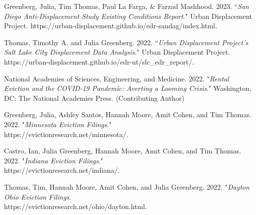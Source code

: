 \begin{cvparagraph}

Greenberg, Julia, Tim Thomas, Paul La Farga, \& Farzad Mashhood. 2023. “\emph{San Diego Anti-Displacement Study Existing Conditions Report}." Urban Displacement Project. https://urban-displacement.github.io/edr-sandag/index.html.
\end{cvparagraph}

\begin{cvparagraph}

Thomas, Timothy A. and Julia Greenberg. 2022. “\emph{Urban Displacement Project’s Salt Lake City Displacement Data Analysis}." Urban Displacement Project. https://urban-displacement.github.io/edr-ut/slc\_edr\_report/.
\end{cvparagraph}

\begin{cvparagraph}

National Academies of Sciences, Engineering, and Medicine. 2022. "\emph{Rental Eviction and the COVID-19 Pandemic: Averting a Looming Crisis}." Washington, DC: The National Academies Press. (Contributing Author)
\end{cvparagraph}

\begin{cvparagraph}

Greenberg, Julia, Ashley Santos, Hannah Moore, Amit Cohen, and Tim Thomas. 2022. "\emph{Minnesota Eviction Filings}."\\ https://evictionresearch.net/minnesota/.
\end{cvparagraph}

\begin{cvparagraph}

Castro, Ian, Julia Greenberg, Hannah Moore, Amit Cohen, and Tim Thomas. 2022. "\emph{Indiana Eviction Filings}."\\
https://evictionresearch.net/indiana/.
\end{cvparagraph}

\begin{cvparagraph}

Thomas, Tim, Hannah Moore, Amit Cohen, and Julia Greenberg. 2022. "\emph{Dayton Ohio Eviction Filings}.\\
https://evictionresearch.net/ohio/dayton.html. 
\end{cvparagraph}

